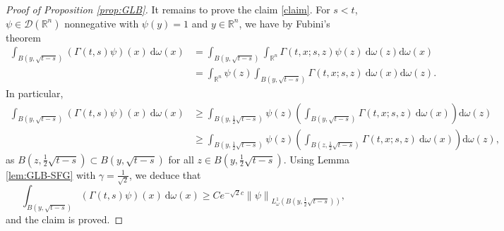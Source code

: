 \documentclass[12pt, letterpaper]{amsart}
\theoremstyle{definition}
\theoremstyle{remark}
\numberwithin{equation}{section}
\begin{document}
\begin{proof}[Proof of Proposition \ref{prop:GLB}]
    It remains to prove the claim \eqref{claim}. For $s<t$, $\psi \in \mathcal{D}(\mathbb{R}^n)$ nonnegative with $\psi(y)=1$ and $y \in \mathbb{R}^n$, we have by Fubini's theorem 
    \begin{align*}
        \int_{B(y,\sqrt{t-s})} (\Gamma(t,s)\psi)(x)\ \mathrm{d}\omega(x)&= \int_{B(y,\sqrt{t-s})} \int_{\mathbb{R}^n}\Gamma(t,x;s,z)\psi(z)\ \mathrm{d}\omega(z)\mathrm{d}\omega(x) 
        \\&= \int_{\mathbb{R}^n} \psi(z) \int_{B(y,\sqrt{t-s})} \Gamma(t,x;s,z) \ \mathrm{d}\omega(x)\mathrm{d}\omega(z).
    \end{align*}
    In particular,
    \begin{align*}
        \int_{B(y,\sqrt{t-s})} (\Gamma(t,s)\psi)(x)\ \mathrm{d}\omega(x)&\ge  \int_{B(y,\frac{1}{2}\sqrt{t-s})} \psi(z)\left (  \int_{B(y,\sqrt{t-s})} \Gamma(t,x;s,z) \ \mathrm{d}\omega(x) \right )\mathrm{d}\omega(z)
        \\& \ge \int_{B(y,\frac{1}{2}\sqrt{t-s})} \psi(z)\left (  \int_{B(z,\frac{1}{2}\sqrt{t-s})} \Gamma(t,x;s,z) \ \mathrm{d}\omega(x) \right )\mathrm{d}\omega(z),
    \end{align*}
    as $B(z,\frac{1}{2}\sqrt{t-s}) \subset B(y,\sqrt{t-s})$ for all $z \in B(y,\frac{1}{2}\sqrt{t-s})$.
    Using Lemma \ref{lem:GLB-SFG} with $\gamma=\frac{1}{\sqrt{2}}$, we deduce that 
    \begin{equation*}
        \int_{B(y,\sqrt{t-s})} (\Gamma(t,s)\psi)(x)\ \mathrm{d}\omega(x) \ge C e^{-\sqrt{2} c} \left\|  \psi \right\|_{L^1_\omega(B(y,\frac{1}{2}\sqrt{t-s}))},
    \end{equation*}
    and the claim is proved.
    
\end{proof}



\appendix
\end{document}
